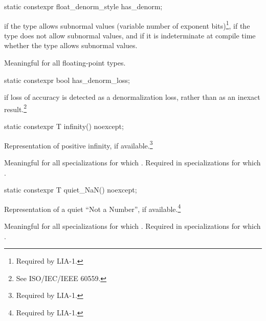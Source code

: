 %
\begin{itemdecl}
static constexpr float_denorm_style has_denorm;
\end{itemdecl}

%
\begin{itemdescr}
\pnum
{}
if the type allows subnormal values
(variable number of exponent bits)\footnote{Required by LIA-1.},
if the type does not allow subnormal values,
and
if it is indeterminate at compile time whether the type allows
subnormal values.

\pnum
Meaningful for all floating-point types.
\end{itemdescr}

%
\begin{itemdecl}
static constexpr bool has_denorm_loss;
\end{itemdecl}

\begin{itemdescr}
\pnum
{} if loss of accuracy is detected as a
denormalization loss, rather than as an inexact result.\footnote{See
ISO/IEC/IEEE 60559.}
\end{itemdescr}

%
\begin{itemdecl}
static constexpr T infinity() noexcept;
\end{itemdecl}

\begin{itemdescr}
\pnum
Representation of positive infinity, if available.\footnote{Required by LIA-1.}

\pnum
Meaningful for all specializations for which
.
Required in specializations for which
.
\end{itemdescr}

%
\begin{itemdecl}
static constexpr T quiet_NaN() noexcept;
\end{itemdecl}

\begin{itemdescr}
\pnum
Representation of a quiet ``Not a Number'', if available.\footnote{Required by LIA-1.}

\pnum
Meaningful for all specializations for which
.
Required in specializations for which
.
\end{itemdescr}

